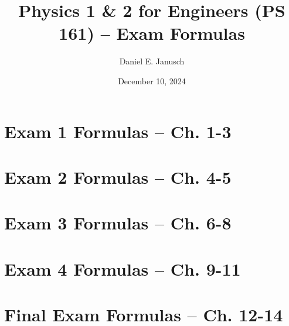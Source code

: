 \documentclass[12pt]{article}
\begin{document}
\title{Physics 1 \& 2 for Engineers (PS 161) – Exam Formulas}
\author{Daniel E. Janusch}
\date{December 10, 2024}
\maketitle

\tableofcontents

\newpage \section{Exam 1 Formulas – Ch. 1-3} 
\newpage \section{Exam 2 Formulas – Ch. 4-5} 
\newpage \section{Exam 3 Formulas – Ch. 6-8} 
\newpage \section{Exam 4 Formulas – Ch. 9-11} 
\newpage \section{Final Exam Formulas – Ch. 12-14} 
\end{document}
